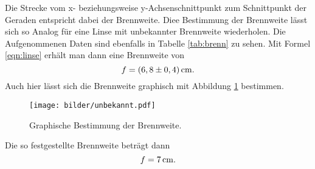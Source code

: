 Die Strecke vom x- beziehungsweise y-Achsenschnittpunkt zum Schnittpunkt der Geraden
entspricht dabei der Brennweite.
Diee Bestimmung der Brennweite lässt sich so Analog für eine Linse mit unbekannter
Brennweite wiederholen. Die Aufgenommenen Daten sind ebenfalls in Tabelle \ref{tab:brenn}
zu sehen. Mit Formel \eqref{eqn:linse} erhält man dann eine Brennweite von
\begin{equation*}
  f= (6,8 \pm 0,4) \,\si{\centi\meter}.
\end{equation*}
Auch hier lässt sich die Brennweite graphisch mit Abbildung \ref{fig:unb}
bestimmen.
\begin{figure}[H]
  \centering
  \texttt{[image: bilder/unbekannt.pdf]}
  \caption{Graphische Bestimmung der Brennweite.}
  \label{fig:unb}
\end{figure}
Die so festgestellte Brennweite beträgt dann
\begin{equation*}
  f = 7\,\si{\centi\meter}.
\end{equation*}
